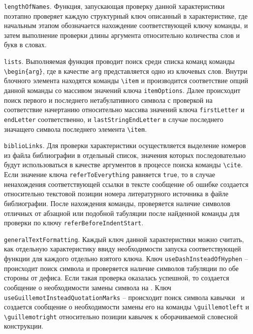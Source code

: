     \verb|lengthOfNames|. Функция, запускающая проверку данной характеристики поэтапно проверяет каждую структурный ключ описанный в характеристике, где начальным этапом обозначается нахождение соответствующей ключу команды, и затем выполнение проверки длины аргумента относительно количества слов и букв в словах.

    \verb|lists|. Выполняемая функция проводит поиск среди списка команд команды \verb|\begin{arg}|, где в качестве \verb|arg| представляется одно из ключевых слов. Внутри блочного элемента находятся команды \verb|\item| и производится соответствие опций данной команды со массивом значений ключа \verb|itemOptions|. Далее происходит поиск первого и последнего нетабулативного символа с проверкой на соответствие начертанию относительно массива значений ключа \verb|firstLetter| и \verb|endLetter| соответственно, и \verb|lastStringEndLetter| в случае последнего значащего символа последнего элемента \verb|\item|.

     \verb|biblioLinks|. Для проверки характеристики осуществляется выделение номеров из файла библиографии в отдельный список, значения которых последовательно будут использоваться в качестве аргументов в процессе поиска команды \verb|\cite|. Если значение ключа \verb|referToEverything| равняется \verb|true|, то в случае ненахождения соответствующей ссылки в тексте сообщение об ошибке создается относительно текстовой позиции номера литературного источника в файле библиографии. После нахождения команды, проверяется наличие символов отличных от абзацной или подобной табуляции после найденной команды для проверки по ключу \verb|referBeforeIndentStart|. 

    \verb|generalTextFormatting|. Каждый ключ данной характеристики можно считать, как отдельную характеристику ввиду необходимости запуска соответствующей функции для каждого отдельно взятого ключа. Ключ \verb|useDashInsteadOfHyphen| -- происходит поиск символа \guillemotright и проверяется наличие символов табуляции по обе стороны от дефиса. Если такая проверка оказалась успешной, то создается сообщение о необходимости замены символа на \guillemotright. Ключ \verb|useGuillemotInsteadQuotationMarks| -- происходит поиск символа  кавычки\guillemotright\verb| | и создается сообщение о необходимости замены его на команды \verb|\guillemotleft| и  \verb|\guillemotright| относительно позиции кавычек к оборачиваемой словесной конструкции.
    
